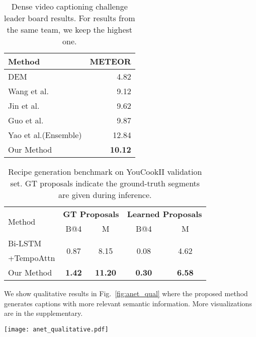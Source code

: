 \documentclass[10pt,twocolumn,letterpaper]{article}
\begin{document}
\begin{table}[t]
\centering
\caption{Dense video captioning challenge leader board results. For results from the same team, we keep the highest one.}
\label{tbl:result_leaderboard}
    {\small
\begin{tabular}{lr}
\toprule
Method & METEOR \\
\midrule
DEM~\cite{krishna2017dense} & 4.82 \\
Wang et al. & 9.12 \\
Jin et al. & 9.62 \\
Guo et al. & 9.87 \\
Yao et al.\footnotemark (Ensemble) & 12.84 \\
\midrule
Our Method & \textbf{10.12} \\
\bottomrule
\end{tabular}
    }
    \vspace{-8pt}
\end{table}

\begin{table}[t]
\centering
\caption{Recipe generation benchmark on YouCookII validation set. GT proposals indicate the ground-truth segments are given during inference.}
\label{tbl:result_densecap_yc2}
    {\small
\begin{tabular}{lcccc}
\toprule
\multirow{2}{*}{Method} & \multicolumn{2}{c}{\textbf{GT Proposals}} & \multicolumn{2}{c}{\textbf{Learned Proposals}}\\
& B@4 & M & B@4 & M\\
\midrule
Bi-LSTM  & \multirow{2}{*}{0.87} & \multirow{2}{*}{8.15} & \multirow{2}{*}{0.08} & \multirow{2}{*}{4.62} \\ +TempoAttn &  &  &  \\  
\midrule
Our Method & \textbf{1.42} & \textbf{11.20} & \textbf{0.30} & \textbf{6.58} \\ \bottomrule
\end{tabular}
    }
    \vspace{-8pt}
\end{table}

We show qualitative results in Fig.~\ref{fig:anet_qual} where the proposed method generates captions with more relevant semantic information. More visualizations are in the supplementary.

\begin{figure*}[t]
\centering 
  \texttt{[image: anet\_qualitative.pdf]}
\vspace{-2pt}
       \caption{Qualitative results on ActivityNet Captions. The color bars represent different events. Colored text highlight relevant content to the event. Our model generates more relevant attributes as compared to the baseline.}
    \vspace{-8pt}
\label{fig:anet_qual}
\end{figure*}
\end{document}
